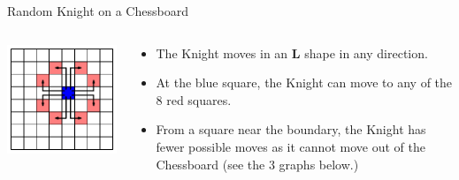 \documentclass[letterpaper, mathserif]{beamer}
\begin{document}
\begin{frame}{Random Knight on a Chessboard}

\begin{columns}
\begin{column}{0.28\textwidth}
\includegraphics[width=1.2\textwidth]{./RandomKnight/KnightMoves44}
\end{column}
\begin{column}{0.7\textwidth}
\hspace{-20pt}\begin{itemize}
\item The Knight moves in an \alert{\bf L} shape in any direction.
\item At the {\color{blue} blue square}, the Knight
can move to any of the 8 {\color{red} red squares}.
\item From a square near the boundary, the Knight has fewer possible
moves as it cannot move out of the Chessboard (see the 3 graphs below.)
\end{itemize}
\end{column}
\end{columns}
\medskip


\end{frame}
\end{document}
